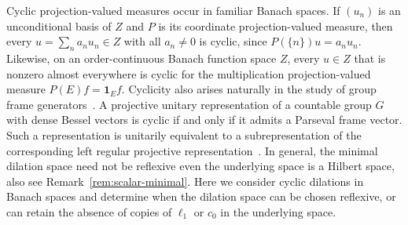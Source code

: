 \documentclass[11pt,leqno]{amsart}
\theoremstyle{compact}
\numberwithin{equation}{section}
\theoremstyle{compactremark}
\theoremstyle{compact}
\newcommand{\1}{\mathbbm{1}}
\begin{document}
Cyclic projection-valued measures occur in familiar Banach spaces. If $(u_n)$ is an unconditional basis of $Z$ and $P$ is its coordinate projection-valued measure, then every $u=\sum_n a_nu_n\in Z$ with all $a_n\ne0$ is cyclic, since $P(\{n\})u=a_nu_n$. Likewise, on an order-continuous Banach function space $Z$, every $u\in Z$ that is nonzero almost everywhere is cyclic for the multiplication projection-valued measure $P(E)f=\mathbf{1}_Ef$. Cyclicity also arises naturally in the study of group frame generators~\cite{HanLarson2000,HanHuLiuLiu2026}. A projective unitary representation of a countable group $G$ with dense Bessel vectors is cyclic if and only if it admits a Parseval frame vector. Such a representation is unitarily equivalent to a subrepresentation of the corresponding left regular projective representation~\cite[Prop.~1.4 and Thm.~1.14]{HanHuLiuLiu2026}. 
In general, the minimal dilation space need not be reflexive even the underlying space is a Hilbert space, also see Remark~\ref{rem:scalar-minimal}. Here we consider cyclic dilations in Banach spaces and determine when the dilation space can be chosen reflexive, or can retain the absence of copies of $\ell_1$ or $c_0$ in the underlying space.



\end{document}
